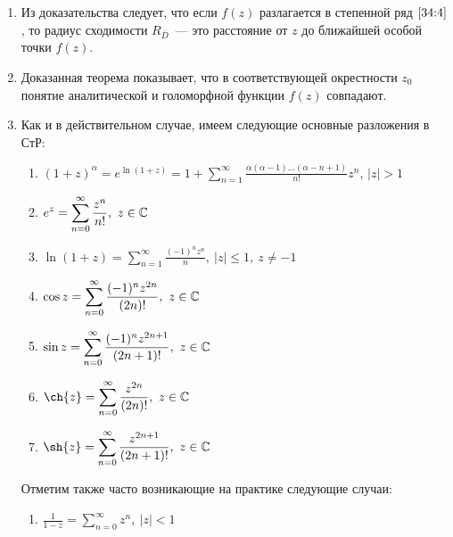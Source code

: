 \documentclass[../../main.tex]{subfiles}
\begin{document}
\begin{rems}
	
	\;
	
	\begin{enumerate}
		\item Из доказательства следует, что если $ f(z) $ разлагается в степенной 
		ряд $ \eqref{34:4} $, то радиус сходимости $ R_{\overline{D}} $~--- это 
		расстояние от $ z $ до ближайшей особой точки $ f(z) $.
		
		\item Доказанная теорема показывает, что в соответствующей окрестности $ z_0 
		$ понятие аналитической и голоморфной функции $f(z)$ совпадают.
		
		\item Как и в действительном случае, имеем следующие основные разложения в 
		СтР:
		
		\begin{enumerate}
			\item $\displaystyle (1 + z)^\alpha = e^{\ln(1 + z)} = 1 + \sum\limits_{n = 
			1}^{\infty} 
			\frac{\alpha(\alpha - 1) \ldots (\alpha - n +1)}{n!}z^n,\, |z| > 1 $
			
			\item $\displaystyle e^z = \sum\limits_{n = 0}^{\infty} \frac{z^n}{n!},\ z 
			\in \mathbb{C} $
			
			\item $\displaystyle \ln(1 + z) = \sum\limits_{n = 1}^{\infty} 
			\frac{(-1)^nz^n}{n},\ |z| \leq 1,\  z \neq -1 $
			
			\item $\displaystyle \cos{z} = \sum\limits_{n = 0}^{\infty} 
			\frac{(-1)^nz^{2n}}{(2n)!},\  z \in \mathbb{C} $
			
			\item $\displaystyle \sin{z} = \sum\limits_{n = 0}^{\infty} 
			\frac{(-1)^nz^{2n + 1}}{(2n 
			+ 1)!},\  z \in \mathbb{C} $
			
			\item $\displaystyle \ch{z} = \sum\limits_{n = 0}^{\infty} 
			\frac{z^{2n}}{(2n)!},\  z \in \C $
			
			\item $\displaystyle \sh{z} = \sum\limits_{n = 0}^{\infty} \frac{z^{2n + 
			1}}{(2n + 
			1)!},\ z \in \C $
		\end{enumerate}
		
		Отметим также часто возникающие на практике следующие случаи:
		
		\begin{enumerate}
			\item $\displaystyle \frac{1}{1 - z} = \sum\limits_{n = 0}^{\infty} z^n,\ 
			|z| < 1$
			

\end{enumerate}
\end{enumerate}
\end{rems}
\end{document}
